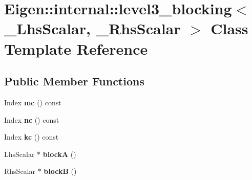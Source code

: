 \hypertarget{class_eigen_1_1internal_1_1level3__blocking}{}\section{Eigen\+::internal\+::level3\+\_\+blocking$<$ \+\_\+\+Lhs\+Scalar, \+\_\+\+Rhs\+Scalar $>$ Class Template Reference}
\label{class_eigen_1_1internal_1_1level3__blocking}
\subsection*{Public Member Functions}
\begin{DoxyCompactItemize}
\item 
\mbox{\label{class_eigen_1_1internal_1_1level3__blocking_a42652281565b0d88009c6a2c69a61b90}} 
Index {\bfseries mc} () const
\item 
\mbox{\label{class_eigen_1_1internal_1_1level3__blocking_a967d4f0e4ac537497481e18ebb229ae2}} 
Index {\bfseries nc} () const
\item 
\mbox{\label{class_eigen_1_1internal_1_1level3__blocking_a2348863b8e4618d9cf28ac3274320959}} 
Index {\bfseries kc} () const
\item 
\mbox{\label{class_eigen_1_1internal_1_1level3__blocking_ad918c2b9d73b2cc6134446cf36a500ae}} 
Lhs\+Scalar $\ast$ {\bfseries blockA} ()
\item 
\mbox{\label{class_eigen_1_1internal_1_1level3__blocking_a10666dbe23e34516bc9f8221fcd53ad0}} 
Rhs\+Scalar $\ast$ {\bfseries blockB} ()
\end{DoxyCompactItemize}
